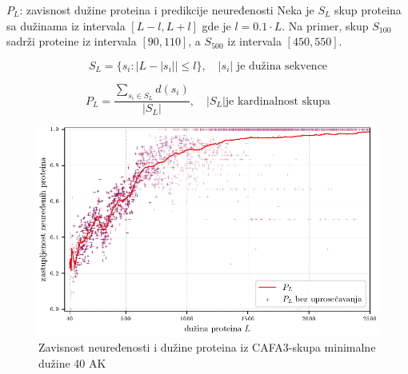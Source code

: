 \documentclass{beamer}
\begin{document}
\begin{frame}{$P_L$: zavisnost dužine proteina i predikcije neuređenosti}
  Neka je $S_L$ skup proteina sa dužinama iz intervala $[L-l, L+l]$ gde je
  $l = 0.1 \cdot L$.  Na primer, skup $S_{100}$ sadrži proteine iz intervala
  $[90, 110]$, a $S_{500}$ iz intervala $[450, 550]$.

  $$ S_L = \{s_i :  | L -  | s_i | | \le l  \}, \quad   |s_i| \text{ je dužina
  sekvence}  $$

  $$ P_L = \dfrac{ \sum_{s_i \in S_L} d(s_i)} {| S_L |}, \quad   |S_L| \text{
  je kardinalnost skupa}$$
\end{frame}


\begin{frame}{}
  \begin{figure}[]
    \centering
    \includegraphics[scale=0.8]{plots/PL_F}
    \caption {
      \footnotesize Zavisnost neuređenosti i dužine proteina iz CAFA3-skupa
      minimalne dužine 40 AK
    }
  \end{figure}
\end{frame}
\end{document}
